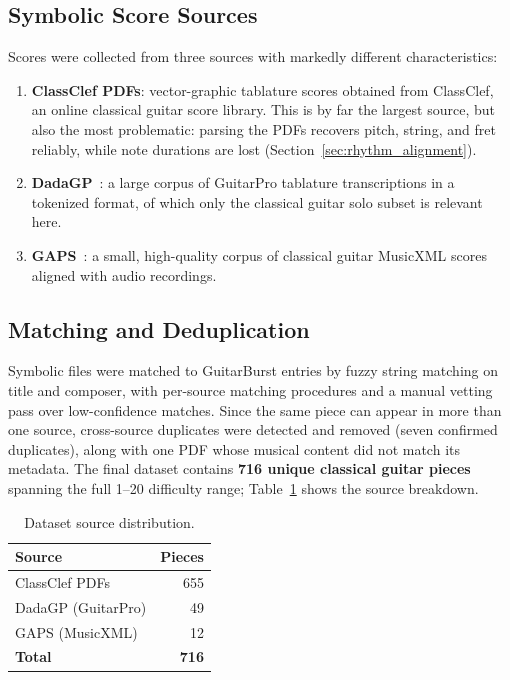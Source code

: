 \subsection{Symbolic Score Sources}
Scores were collected from three sources with markedly different characteristics:
\begin{enumerate}
    \item \textbf{ClassClef PDFs}: vector-graphic tablature scores obtained from ClassClef, an online classical guitar score library. This is by far the largest source, but also the most problematic: parsing the PDFs recovers pitch, string, and fret reliably, while note durations are lost (Section~\ref{sec:rhythm_alignment}).
    \item \textbf{DadaGP}~\cite{sarmento2021dadagp}: a large corpus of GuitarPro tablature transcriptions in a tokenized format, of which only the classical guitar solo subset is relevant here.
    \item \textbf{GAPS}~\cite{riley2024gaps}: a small, high-quality corpus of classical guitar MusicXML scores aligned with audio recordings.
\end{enumerate}

\subsection{Matching and Deduplication}
Symbolic files were matched to GuitarBurst entries by fuzzy string matching on title and composer, with per-source matching procedures and a manual vetting pass over low-confidence matches. Since the same piece can appear in more than one source, cross-source duplicates were detected and removed (seven confirmed duplicates), along with one PDF whose musical content did not match its metadata. The final dataset contains \textbf{716 unique classical guitar pieces} spanning the full 1--20 difficulty range; Table~\ref{tab:dataset_sources} shows the source breakdown.

\begin{table}[htbp]
\centering
\caption{Dataset source distribution.}
\label{tab:dataset_sources}
\begin{tabular}{lr}
\toprule
\textbf{Source} & \textbf{Pieces} \\
\midrule
ClassClef PDFs & 655 \\
DadaGP (GuitarPro) & 49 \\
GAPS (MusicXML) & 12 \\
\midrule
\textbf{Total} & \textbf{716} \\
\bottomrule
\end{tabular}
\end{table}

